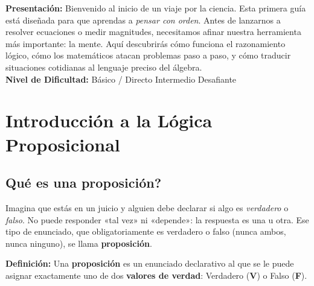 \documentclass[12pt, letterpaper]{article}
\begin{document}


\vspace{4pt}
\begin{cuadroinfo}
  \small
  \textbf{Presentación:} Bienvenido al inicio de un viaje por la ciencia. Esta primera guía está diseñada para que aprendas a \emph{pensar con orden}. Antes de lanzarnos a resolver ecuaciones o medir magnitudes, necesitamos afinar nuestra herramienta más importante: la mente. Aquí descubrirás cómo funciona el razonamiento lógico, cómo los matemáticos atacan problemas paso a paso, y cómo traducir situaciones cotidianas al lenguaje preciso del álgebra.
  \\[4pt]
  \textbf{Nivel de Dificultad:}\quad
  \facil{} Básico / Directo \quad
  \medio{} Intermedio \quad
  \dificil{} Desafiante
\end{cuadroinfo}

\vspace{8pt}

\section{Introducción a la Lógica Proposicional}

\subsection{\textquestiondown Qué es una proposición?}

Imagina que estás en un juicio y alguien debe declarar si algo es \emph{verdadero} o \emph{falso}. No puede responder «tal vez» ni «depende»: la respuesta es una u otra. Ese tipo de enunciado, que obligatoriamente es verdadero o falso (nunca ambos, nunca ninguno), se llama \textbf{proposición}.

\begin{cuadroteoria}
  \textbf{Definición:} Una \textbf{proposición} es un enunciado declarativo al que se le puede asignar exactamente uno de dos \textbf{valores de verdad}: Verdadero (\textbf{V}) o Falso (\textbf{F}).
\end{cuadroteoria}
\end{document}
